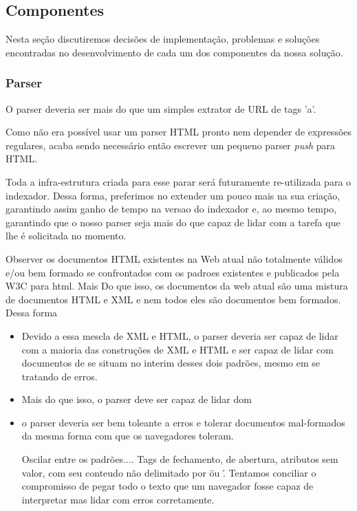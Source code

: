 \documentclass[10pt,twocolumn]{article}
\begin{document}
\subsection{Componentes}

Nesta seção discutiremos decisões de implementação, problemas e soluções
encontradas no desenvolvimento de cada um dos componentes da nossa
solução.

\subsubsection{Parser}

O parser deveria ser mais do que um simples extrator de URL de tags 'a'.

Como não era possível usar um parser HTML pronto nem depender de expressões
regulares, acaba sendo necessário então escrever um pequeno parser \emph{push}
para HTML.

Toda a infra-estrutura criada para esse parar será futuramente re-utilizada
para o indexador. Dessa forma, preferimos no extender um pouco mais na sua
criação, garantindo assim ganho de tempo na versao do indexador e, ao mesmo
tempo, garantindo que o nosso parser seja mais do que capaz de lidar com a
tarefa que lhe é solicitada no momento.

Observer os documentos HTML existentes na Web atual não totalmente válidos e/ou
bem formado se confrontados com os padroes existentes e publicados pela W3C
para html. Mais Do que isso, os documentos da web atual são uma mistura de
documentos HTML e XML e nem todos eles são documentos bem formados. Dessa forma

\begin{itemize}

\item Devido a essa mescla de XML e HTML, o parser deveria ser capaz de lidar
com a maioria das construções de XML e HTML e ser capaz de lidar com documentos
de se situam no interim desses dois padrões, mesmo em se tratando de erros.

\item Mais do que isso, o parser deve ser capaz de lidar dom

\item o parser deveria ser bem toleante a erros e tolerar documentos
mal-formados da mesma forma com que os navegadores toleram. 

Oscilar entre os padrões.... Tags de fechamento, de abertura, atributos sem
valor, com seu conteudo não delimitado por \" ou \'. Tentamos conciliar o
compromisso de pegar todo o texto que um navegador fosse capaz de interpretar
mas lidar com erros corretamente.

\end{itemize}
\end{document}
